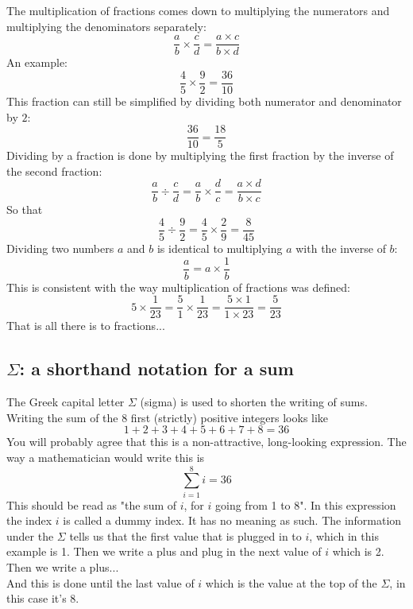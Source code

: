 \noindent The multiplication of fractions comes down to multiplying the numerators and multiplying the denominators separately:
\begin{equation*}
\frac{a}{b} \times \frac{c}{d} = \frac{a \times c}{b \times d}
\end{equation*}
An example:
\begin{equation*}
\frac{4}{5} \times \frac{9}{2} = \frac{36}{10}
\end{equation*}
This fraction can still be simplified by dividing both numerator and denominator by $2$:
$$
\frac{36}{10} = \frac{18}{5}
$$
Dividing by a fraction is done by multiplying the first fraction by the inverse of the second fraction:
$$
\frac{a}{b} \div \frac{c}{d} = \frac{a}{b} \times \frac{d}{c} = \frac{a \times d}{b \times c}
$$
So that
\begin{equation*}
\frac{4}{5} \div \frac{9}{2} = \frac{4}{5} \times \frac{2}{9} = \frac{8}{45}
\end{equation*}
Dividing two numbers $a$ and $b$ is identical to multiplying $a$ with the inverse of $b$:
$$
\frac{a}{b} = a \times \frac{1}{b}
$$
This is consistent with the way multiplication of fractions was defined:
\begin{equation*}
5 \times \frac{1}{23} = \frac{5}{1} \times \frac{1}{23} = \frac{5 \times 1}{1 \times 23} = \frac{5}{23}
\end{equation*}
That is all there is to fractions...

\subsection{$\Sigma$: a shorthand notation for a sum}

\noindent The Greek capital letter $\Sigma$ (sigma) is used to shorten the writing of sums. Writing the sum of the 8 first (strictly) positive integers looks like
$$
1 + 2 + 3+ 4 + 5 + 6 + 7 + 8  = 36
$$
You will probably agree that this is a non-attractive, long-looking expression. The way a mathematician would write this is
$$
\sum\limits_{i = 1}^{8} i = 36
$$
This should be read as "the sum of $i$, for $i$ going from 1 to 8". In this expression the index $i$ is called a dummy index. It has no meaning as such. The information under the $\Sigma$ tells us that the first value that is plugged in to $i$, which in this example is 1. Then we write a plus and plug in the next value of $i$ which is 2. Then we write a plus...\\
And this is done until the last value of $i$ which is the value at the top of the $\Sigma$, in this case it's 8.\\

